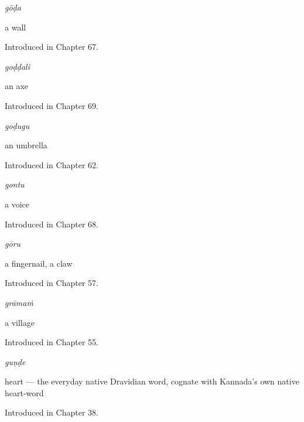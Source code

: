 \noindent\begin{minipage}[t]{\linewidth}
\raggedright
\textbf{}\enspace\emph{gōḍa}\par
\small a wall\par
\footnotesize Introduced in Chapter 67.
\end{minipage}\par\medskip

\noindent\begin{minipage}[t]{\linewidth}
\raggedright
\textbf{}\enspace\emph{goḍḍali}\par
\small an axe\par
\footnotesize Introduced in Chapter 69.
\end{minipage}\par\medskip

\noindent\begin{minipage}[t]{\linewidth}
\raggedright
\textbf{}\enspace\emph{goḍugu}\par
\small an umbrella\par
\footnotesize Introduced in Chapter 62.
\end{minipage}\par\medskip

\noindent\begin{minipage}[t]{\linewidth}
\raggedright
\textbf{}\enspace\emph{gontu}\par
\small a voice\par
\footnotesize Introduced in Chapter 68.
\end{minipage}\par\medskip

\noindent\begin{minipage}[t]{\linewidth}
\raggedright
\textbf{}\enspace\emph{gōru}\par
\small a fingernail, a claw\par
\footnotesize Introduced in Chapter 57.
\end{minipage}\par\medskip

\noindent\begin{minipage}[t]{\linewidth}
\raggedright
\textbf{}\enspace\emph{grāmaṁ}\par
\small a village\par
\footnotesize Introduced in Chapter 55.
\end{minipage}\par\medskip

\noindent\begin{minipage}[t]{\linewidth}
\raggedright
\textbf{}\enspace\emph{guṇḍe}\par
\small heart — the everyday native Dravidian word, cognate with Kannada's own native heart-word\par
\footnotesize Introduced in Chapter 38.
\end{minipage}\par\medskip

